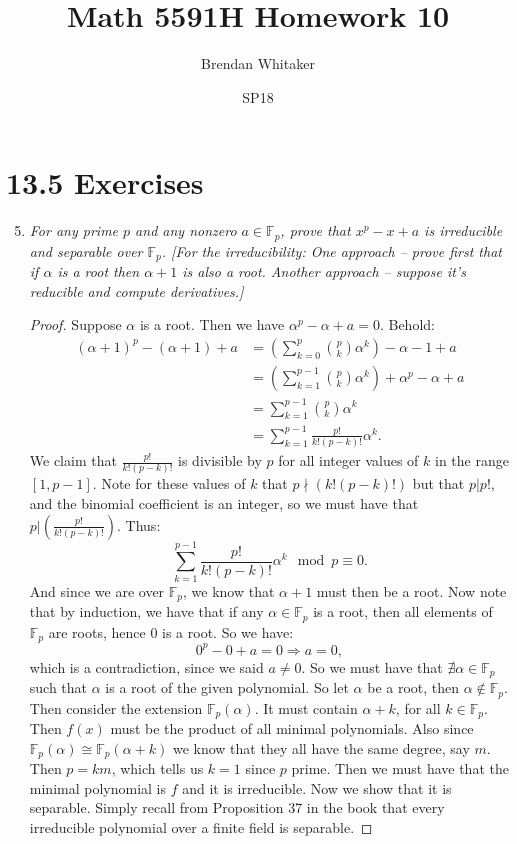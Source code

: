 \documentclass[10pt,oneside,reqno]{amsart}
\theoremstyle{plain}
\theoremstyle{definition}
\theoremstyle{remark}
\theoremstyle{plain}
\newcommand{\F}{\mathbb{F}}
\newcommand{\bee}{\begin{equation}\begin{aligned}}
\newcommand{\eee}{\end{aligned}\end{equation}}
\newcommand{\fracc}{\frac}
\newcommand{\lpar}{\left(}
\newcommand{\rpar}{\right)}
\begin{document}
\title{Math 5591H Homework 10}

\date{SP18}

\author[Brendan Whitaker]{Brendan Whitaker}

\maketitle



\section*{13.5 Exercises}

\begin{enumerate}[label=\arabic*.]
\setcounter{enumi}{4}

\item \textit{For any prime $p$ and any nonzero $a \in \F_p$, prove that $x^p - x + a$ is irreducible and separable over $\F_p$. [For the irreducibility: One approach -- prove first that if $\alpha$ is a root then $\alpha + 1$ is also a root. Another approach -- suppose it's reducible and compute derivatives.]}

\begin{proof}
Suppose $\alpha$ is a root. Then we have $\alpha^p - \alpha + a = 0$. Behold: 
\bee
(\alpha + 1)^p - (\alpha + 1) + a &= \lpar\sum_{k = 0}^p \binom{p}{k}\alpha^k\rpar - \alpha - 1 + a\\
&= \lpar \sum_{k = 1}^{p - 1} \binom{p}{k}\alpha^k \rpar + \alpha^p - \alpha + a\\
&= \sum_{k = 1}^{p - 1} \binom{p}{k}\alpha^k \\
&= \sum_{k = 1}^{p - 1} \fracc{p!}{k!(p - k)!}\alpha^k.
\eee
We claim that $\fracc{p!}{k!(p - k)!}$ is divisible by $p$ for all integer values of $k$ in the range $[1,p - 1]$. Note for these values of $k$ that $p\nmid (k!(p - k)!)$ but that $p|p!$, and the binomial coefficient is an integer, so we must have that $p|\lpar \fracc{p!}{k!(p - k)!} \rpar $. Thus: 
$$
\sum_{k = 1}^{p - 1} \fracc{p!}{k!(p - k)!}\alpha^k \mod p \equiv 0.
$$
And since we are over $\F_p$, we know that $\alpha + 1$ must then be a root. Now note that by induction, we have that if any $\alpha \in \F_p$ is a root, then all elements of $\F_p$ are roots, hence $0$ is a root. So we have:
$$
0^p - 0 + a = 0 \Rightarrow a = 0,
$$
which is a contradiction, since we said $a\neq 0$. So we must have that $\nexists \alpha \in \F_p$ such that $\alpha$ is a root of the given polynomial. So let $\alpha$ be a root, then $\alpha \notin \F_p$. Then consider the extension $\F_p(\alpha)$. It must contain $\alpha + k$, for all $k \in \F_p$. Then $f(x)$ must be the product of all minimal polynomials. Also since $\F_p(\alpha) \cong \F_p(\alpha + k)$ we know that they all have the same degree, say $m$. Then $p = km$, which tells us $k = 1$ since $p$ prime. Then we must have that the minimal polynomial is $f$ and it is irreducible. 
Now we show that it is separable. Simply recall from Proposition 37 in the book that every irreducible polynomial over a finite field is separable. 
\end{proof}




\end{enumerate}
\end{document}
